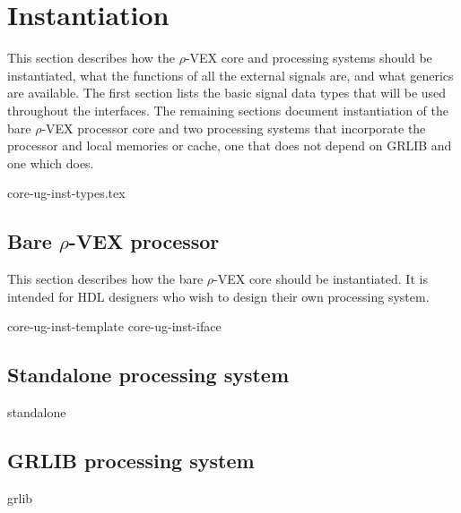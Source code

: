 \documentclass[11pt,twoside]{ce}
\newcommand{\rvex}{\texorpdfstring{$\rho$}{r}-VEX}
\begin{document}
\chapter{Instantiation}
This section describes how the \rvex{} core and processing systems should be
instantiated, what the functions of all the external signals are, and what
generics are available. The first section lists the basic signal data types
that will be used throughout the interfaces. The remaining sections document
instantiation of the bare \rvex{} processor core and two processing systems
that incorporate the processor and local memories or cache, one that does not
depend on GRLIB and one which does.

{core-ug-inst-types.tex}

\section{Bare \rvex{} processor}
This section describes how the bare \rvex{} core should be instantiated. It is 
intended for HDL designers who wish to design their own processing system.

\let\subsection\actualsubsection
\let\subsubsection\actualsubsubsection
\let\paragraph\actualparagraph
{core-ug-inst-template}
{core-ug-inst-iface}

\section{Standalone processing system}
{standalone}

\section{GRLIB processing system}
{grlib}
\end{document}
